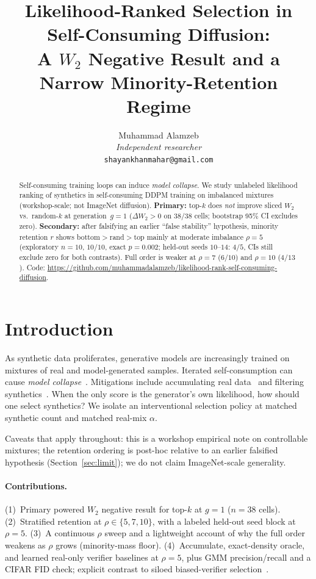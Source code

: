 \documentclass[11pt]{article}
\title{Likelihood-Ranked Selection in Self-Consuming Diffusion:\\
A $W_2$ Negative Result and a Narrow Minority-Retention Regime}
\author{
Muhammad Alamzeb\\
\textit{Independent researcher}\\
\texttt{shayankhanmahar@gmail.com}
}
\date{}
\begin{document}
\maketitle

\begin{abstract}
Self-consuming training loops can induce \emph{model collapse}.
We study unlabeled likelihood ranking of synthetics in self-consuming DDPM training on imbalanced mixtures (workshop-scale; not ImageNet diffusion).
\textbf{Primary:} top-$k$ does \emph{not} improve sliced $W_2$ vs.\ random-$k$ at generation~$g{=}1$
($\Delta W_2>0$ on $38/38$ cells; bootstrap 95\% CI excludes zero).
\textbf{Secondary:} after falsifying an earlier ``false stability'' hypothesis, minority retention $r$ shows bottom$>$rand$>$top mainly at moderate imbalance $\rho{=}5$
(exploratory $n{=}10$, $10/10$, exact $p{=}0.002$; held-out seeds $10$--$14$: $4/5$, CIs still exclude zero for both contrasts).
Full order is weaker at $\rho{=}7$ ($6/10$) and $\rho{=}10$ ($4/13$).
Code: \url{https://github.com/muhammadalamzeb/likelihood-rank-self-consuming-diffusion}.
\end{abstract}

\section{Introduction}
As synthetic data proliferates, generative models are increasingly trained on mixtures of real and model-generated samples.
Iterated self-consumption can cause \emph{model collapse}~\citep{shumailov2023,alemohammad2023,gerstgrasser2024}.
Mitigations include accumulating real data~\citep{gerstgrasser2024} and filtering synthetics~\citep{feng2024,cai2025}.
When the only score is the generator's own likelihood, how should one select synthetics?
We isolate an interventional selection policy at matched synthetic count and matched real-mix $\alpha$.

Caveats that apply throughout: this is a workshop empirical note on controllable mixtures; the retention ordering is post-hoc relative to an earlier falsified hypothesis (Section~\ref{sec:limit}); we do not claim ImageNet-scale generality.

\paragraph{Contributions.}
(1)~Primary powered $W_2$ negative result for top-$k$ at $g{=}1$ ($n{=}38$ cells).
(2)~Stratified retention at $\rho\in\{5,7,10\}$, with a labeled held-out seed block at $\rho{=}5$.
(3)~A continuous $\rho$ sweep and a lightweight account of why the full order weakens as $\rho$ grows (minority-mass floor).
(4)~Accumulate, exact-density oracle, and learned real-only verifier baselines at $\rho{=}5$, plus GMM precision/recall and a CIFAR FID check; explicit contrast to siloed biased-verifier selection~\citep{qiao2026}.
\end{document}
